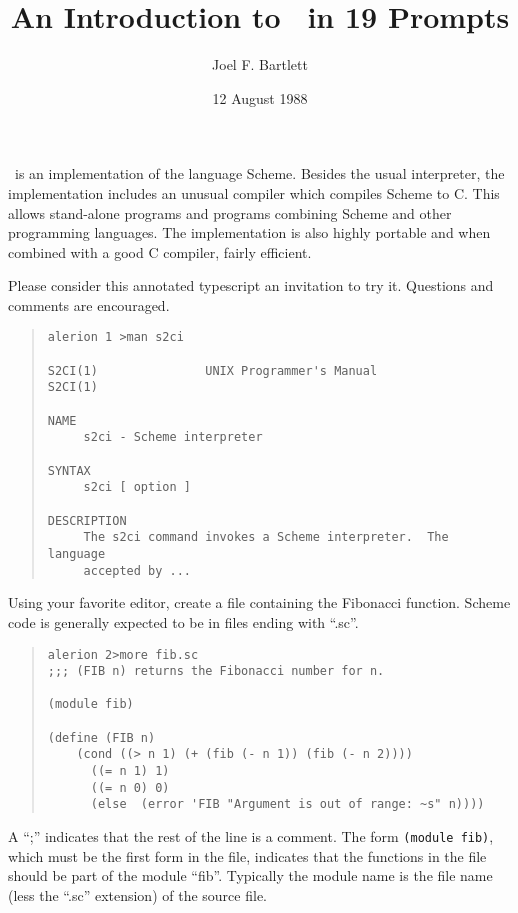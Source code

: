 \documentclass[11pt]{article}
\title{An Introduction to \StoC\ in 19 Prompts}
\author{Joel F. Bartlett}
\date{12 August 1988}
\begin{document}
\maketitle

\StoC\ is an implementation of the language Scheme.  Besides
the usual interpreter, the implementation includes an unusual
compiler which compiles Scheme to C.  This allows stand-alone
programs and programs combining Scheme and other programming
languages.  The implementation is also highly portable and when
combined with a good C compiler, fairly efficient.

Please consider this annotated typescript an invitation to try it.
Questions and comments are encouraged.

\begin{small}
\begin{quote}
\begin{verbatim}
alerion 1 >man s2ci

S2CI(1)               UNIX Programmer's Manual                S2CI(1)

NAME
     s2ci - Scheme interpreter

SYNTAX
     s2ci [ option ]

DESCRIPTION
     The s2ci command invokes a Scheme interpreter.  The language
     accepted by ...
\end{verbatim}
\end{quote}
\end{small}

Using your favorite editor, create a file containing the Fibonacci
function.  Scheme code is generally expected to be in files ending
with ``.sc''.

\begin{small}
\begin{quote}
\begin{verbatim}
alerion 2>more fib.sc
;;; (FIB n) returns the Fibonacci number for n.

(module fib)

(define (FIB n)
    (cond ((> n 1) (+ (fib (- n 1)) (fib (- n 2))))
	  ((= n 1) 1)
	  ((= n 0) 0)
	  (else  (error 'FIB "Argument is out of range: ~s" n))))
\end{verbatim}
\end{quote}
\end{small}

A ``;'' indicates that the rest of the line is a comment.  The form
\texttt{(module fib)}, which must be the first form in the file, indicates
that the functions in the file should be part of the module ``fib''.
Typically the module name is the file name (less the ``.sc'' extension)
of the source file.
\end{document}
